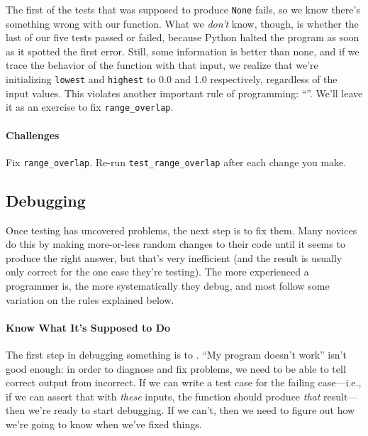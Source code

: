 \documentclass{book}
\begin{document}
The first of the tests that was supposed to produce \texttt{None} fails,
so we know there's something wrong with our function. What we
\emph{don't} know, though, is whether the last of our five tests passed
or failed, because Python halted the program as soon as it spotted the
first error. Still, some information is better than none, and if we
trace the behavior of the function with that input, we realize that
we're initializing \texttt{lowest} and \texttt{highest} to 0.0 and 1.0
respectively, regardless of the input values. This violates another
important rule of programming:
``''. We'll leave it as an exercise to fix
\texttt{range\_overlap}.

\mbox{}\paragraph{Challenges}

\begin{swcenumerate}
\item
  Fix \texttt{range\_overlap}. Re-run \texttt{test\_range\_overlap}
  after each change you make.
\end{swcenumerate}

\subsection{Debugging}

Once testing has uncovered problems, the next step is to fix them. Many
novices do this by making more-or-less random changes to their code
until it seems to produce the right answer, but that's very inefficient
(and the result is usually only correct for the one case they're
testing). The more experienced a programmer is, the more systematically
they debug, and most follow some variation on the rules explained below.

\mbox{}\paragraph{Know What It's Supposed to Do}

The first step in debugging something is to
. ``My program doesn't work'' isn't good enough: in order
to diagnose and fix problems, we need to be able to tell correct output
from incorrect. If we can write a test case for the failing case---i.e.,
if we can assert that with \emph{these} inputs, the function should
produce \emph{that} result--- then we're ready to start debugging. If we
can't, then we need to figure out how we're going to know when we've
fixed things.
\end{document}

